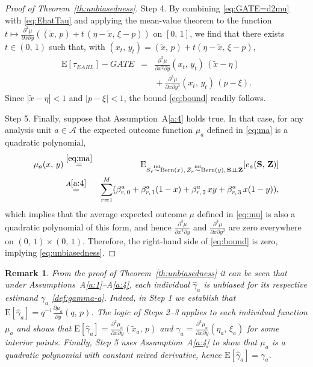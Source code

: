 \documentclass[sigconf,nonacm]{acmart}
\newtheorem{remark}{Remark}
\newcommand{\E}{\mathrm E}
\newcommand{\iidsim}{{\stackrel{\mathrm{iid}}{\sim}}}
\newcommand{\ind}{\perp\!\!\!\perp}
\begin{document}
\begin{proof}[Proof of Theorem~\ref{th:unbiasedness}]
Step 4. By combining \eqref{eq:GATE=d2mu} with \eqref{eq:EhatTau} and applying the mean-value theorem to the function $t\mapsto \frac{\partial^2\mu}{\partial x\partial y}\left((\tilde x,\,p) + t\,(\eta-\tilde x,\,\xi - p)\right)$ on $[0,\,1]$, we find that there exists $t\in(0,\,1)$ such that, with $(x_t,\,y_t) = (\tilde x,\,p) + t(\eta - \tilde x,\,\xi - p)$,
\begin{eqnarray*}
    \E[\hat\tau_{EARL}] - GATE &=& \frac{\partial^3\mu}{\partial x^2\partial y}(x_t,\,y_t)\,(\tilde x-\eta) \nonumber\\ &&{}+ \frac{\partial^3\mu}{\partial x\partial y^2}(x_t,\,y_t)\,(p-\xi).
\end{eqnarray*}
Since $|\tilde x-\eta| < 1$ and $|p-\xi| < 1$, the bound \eqref{eq:bound} readily follows.

Step 5. Finally, suppose that Assumption~A\ref{a:4} holds true. In that case, for any analysis unit $a\in\mathcal A$ the expected outcome function $\mu_a$ defined in \eqref{eq:ma} is a quadratic polynomial,
\begin{eqnarray*}
    \mu_a(x,\,y) &\stackrel{\eqref{eq:ma}}{=}& \E_{S_r\iidsim \mathrm{Bern}(x),\,Z_r\iidsim \mathrm{Bern}(y),\,\mathbf S\ind \mathbf Z}[e_a(\mathbf S,\,\mathbf Z)] \\
    &\stackrel{A\ref{a:4}}{=}& \sum_{r=1}^M(\beta^a_{r,\,0} + \beta^a_{r,\,1}(1-x) + \beta^a_{r,\,2}\, xy + \beta^a_{r,\,3}\,x(1-y)),
\end{eqnarray*}
which implies that the average expected outcome $\mu$ defined in \eqref{eq:mu} is also a quadratic polynomial of this form, and hence $\frac{\partial^3\mu}{\partial x^2\partial y}$ and $\frac{\partial^3\mu}{\partial x\partial y^2}$ are zero everywhere on $(0,\,1)\times (0,\,1)$. Therefore, the right-hand side of \eqref{eq:bound} is zero, implying \eqref{eq:unbiasedness}.
\end{proof}

\begin{remark}\label{rmk:unbiasedness}
    \textup{
    From the proof of Theorem~\ref{th:unbiasedness} it can be seen that under Assumptions~A\ref{a:1}--A\ref{a:4}, each individual $\hat\gamma_a$ is unbiased for its respective estimand $\gamma_a$ \eqref{def:gamma-a}. Indeed, in Step 1 we establish that $\E[\hat\gamma_a] = q^{-1}\frac{\partial\mu_a}{\partial y}(q,\,p)$. The logic of Steps 2--3 applies to each individual function $\mu_a$ and shows that $\E[\hat\gamma_a] = \frac{\partial^2\mu_a}{\partial x \partial y}(\tilde x_a,\,p)$ and $\gamma_a = \frac{\partial^2\mu_a}{\partial x \partial y}(\eta_a,\,\xi_a)$ for some interior points. Finally, Step 5 uses Assumption~A\ref{a:4} to show that $\mu_a$ is a quadratic polynomial with constant mixed derivative, hence $\E[\hat\gamma_a] = \gamma_a$.}
\end{remark}
\end{document}
